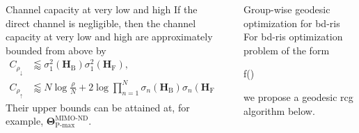 \documentclass[final,xcolor={table}]{beamer}
\newlength{\sepwidth}
\newlength{\colwidth}
\newcommand{\separatorcolumn}{\begin{column}{\sepwidth}\end{column}}
\begin{document}
\begin{frame}[t]
\begin{columns}[t]
\begin{column}{\colwidth}
			\begin{coro}{Channel capacity at very low and high }{}
				\setlength{\leftskip}{\leftmargini}
				\setlength{\rightskip}{\leftmargini}
				If the direct channel is negligible, then the channel capacity at very low and high  are approximately bounded from above by
				\begin{align*}
					C_{\rho_\downarrow} & \lessapprox \sigma_1^2(\mathbf{H}_\mathrm{B}) \sigma_1^2(\mathbf{H}_\mathrm{F}), \\
					C_{\rho_\uparrow} & \lessapprox N \log \frac{\rho}{N} + 2 \log \prod\nolimits_{n=1}^N \sigma_n(\mathbf{H}_\mathrm{B}) \sigma_n(\mathbf{H}_\mathrm{F}).
				\end{align*}
				Their upper bounds can be attained at, for example, $\mathbf{\Theta}_\text{P-max}^\text{MIMO-ND}$.
			\end{coro}
		\end{column}

		\separatorcolumn

		\begin{column}{\colwidth}
			\vspace{-1cm}
			\begin{algo}{Group-wise geodesic optimization for \gls{bd}-\gls{ris}}{}
				\setlength{\leftskip}{\leftmargini}
				\setlength{\rightskip}{\leftmargini}
				For \gls{bd}-\gls{ris} optimization problem of the form
				\begin{maxi*}
					{\scriptstyle{\mathbf{\Theta}}}{f(\mathbf{\Theta})}{}{}
					\addConstraint{\mathbf{\Theta}_g^\mathsf{H} \mathbf{\Theta}_g=\mathbf{I},}{\quad \forall g,}{}
				\end{maxi*}
				we propose a \textcolor{pink!50!pink!75!black}{geodesic} \gls{rcg} algorithm below.
				\vspace{0.5cm}


\end{algo}
\end{column}
\end{columns}
\end{frame}
\end{document}
